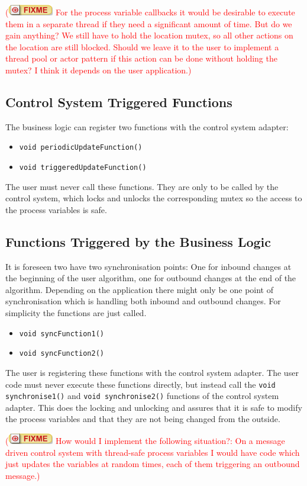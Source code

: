 \documentclass[11pt,a4paper]{scrartcl}
\newcounter{nFixmes}
\newcommand{\fixme}[1]{\addtocounter{nFixmes}{1}\textcolor{red}{(\includegraphics[height=2ex]{fixme} #1)}\xspace}
\begin{document}
\fixme{For the process variable callbacks it would be desirable to execute them in a separate
  thread if they need a significant amount of time. But do we gain anything? We still have to
  hold the location mutex, so all other actions on the location are still blocked.
  Should we leave it to the user to implement a thread pool or actor pattern if this action can be
  done without holding the mutex? I think it depends on the user application.}

\subsection{Control System Triggered Functions}
The business logic can register two functions with the control system adapter:
\begin{itemize}
  \item \texttt{void periodicUpdateFunction()}
  \item \texttt{void triggeredUpdateFunction()}
\end{itemize}
The user must never call these functions. They are only to be called by
the control system, which locks and unlocks the corresponding mutex so 
the access to the process variables is safe.

\subsection{Functions Triggered by the Business Logic}
It is foreseen two have two synchronisation points: One for inbound changes
at the beginning of the user algorithm, one for outbound changes at the end of
the algorithm. Depending on the application there might only be one point of
synchronisation which is handling both inbound and outbound changes. For 
simplicity the functions are just called.
\begin{itemize}
  \item \texttt{void syncFunction1()}
  \item \texttt{void syncFunction2()}
\end{itemize}
The user is registering these functions with the control system adapter. The
user code must never execute these functions directly, but instead call the
\texttt{void synchronise1()} and \texttt{void synchronise2()} functions of the
control system adapter. This does the locking and unlocking and assures that
it is safe to modify the process variables and that they are not being changed
from the outside.

\fixme{How would I implement the following situation?: On a message driven control system
with thread-safe process variables I would have code which just updates the variables at
random times, each of them triggering an outbound message.}
\end{document}
